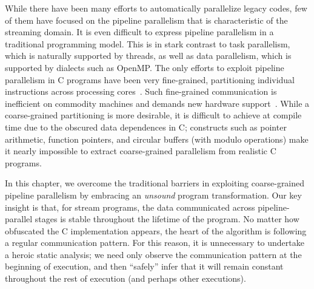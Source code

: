 While there have been many efforts to automatically parallelize legacy
codes, few of them have focused on the pipeline parallelism that is
characteristic of the streaming domain.  It is even difficult to
express pipeline parallelism in a traditional programming model.  This
is in stark contrast to task parallelism, which is naturally supported
by threads, as well as data parallelism, which is supported by
dialects such as OpenMP.  The only efforts to exploit pipeline
parallelism in C programs have been very fine-grained, partitioning
individual instructions across processing
cores~\cite{ottoni05decoupled}.  Such fine-grained communication is
inefficient on commodity machines and demands new hardware
support~\cite{ottoni05decoupled,rangan04array}.  While a
coarse-grained partitioning is more desirable, it is difficult to
achieve at compile time due to the obscured data dependences in C;
constructs such as pointer arithmetic, function pointers, and circular
buffers (with modulo operations) make it nearly impossible to extract
coarse-grained parallelism from realistic C programs.



In this chapter, we overcome the traditional barriers in exploiting
coarse-grained pipeline parallelism by embracing an {\it unsound}
program transformation.  Our key insight is that, for stream programs,
the data communicated across pipeline-parallel stages is stable
throughout the lifetime of the program.  No matter how obfuscated the
C implementation appears, the heart of the algorithm is following a
regular communication pattern.  For this reason, it is unnecessary to
undertake a heroic static analysis; we need only observe the
communication pattern at the beginning of execution, and then
``safely'' infer that it will remain constant throughout the rest of
execution (and perhaps other executions).

